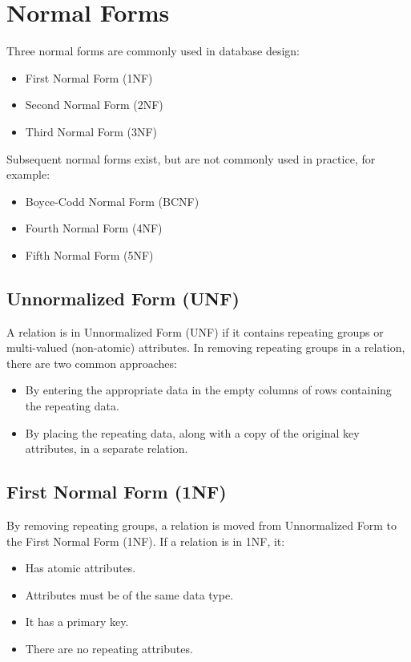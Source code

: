 \documentclass[12pt letter]{report}
\begin{document}
\section{Normal Forms}

Three normal forms are commonly used in database design:
\begin{itemize}
  \item First Normal Form (1NF)
  \item Second Normal Form (2NF)
  \item Third Normal Form (3NF)
\end{itemize}

Subsequent normal forms exist, but are not commonly used in practice, for example:
\begin{itemize}
  \item Boyce-Codd Normal Form (BCNF)
  \item Fourth Normal Form (4NF)
  \item Fifth Normal Form (5NF)
\end{itemize}

\subsection{Unnormalized Form (UNF)}

A relation is in Unnormalized Form (UNF) if it contains repeating groups or multi-valued (non-atomic) attributes. In
removing repeating groups in a relation, there are two common approaches:
\begin{itemize}
  \item By entering the appropriate data in the empty columns of rows containing the repeating data.
  \item By placing the repeating data, along with a copy of the original key attributes, in a separate relation.
\end{itemize}

\subsection{First Normal Form (1NF)}


By removing repeating groups, a relation is moved from Unnormalized Form to the First Normal Form (1NF). If a relation
is in 1NF, it:
\begin{itemize}
  \item Has atomic attributes.
  \item Attributes must be of the same data type.
  \item It has a primary key.
  \item There are no repeating attributes.
\end{itemize}
\end{document}
